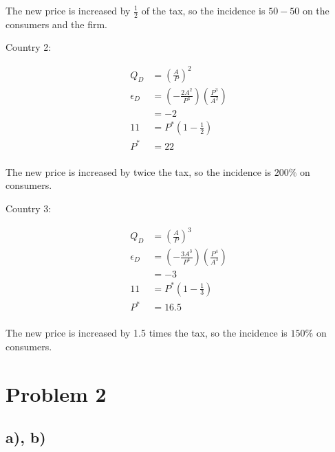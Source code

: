 \documentclass[12pt,letterpaper]{article}
\theoremstyle{definition}
\begin{document}
The new price is increased by $\frac{1}{2}$ of the tax, so the incidence is
$50-50$ on the consumers and the firm.

Country 2:

\begin{align*}
  Q_D &= (\frac{A}{P})^2 \\
  \epsilon_D &= (-\frac{2A^2}{P^3})(\frac{P^3}{A^2}) \\
      &= -2 \\
  11 &= P^*(1 - \frac{1}{2}) \\
  P^* &= 22 \\
\end{align*}

The new price is increased by twice the tax, so the incidence is $200\%$ on
consumers.

Country 3:

\begin{align*}
  Q_D &= (\frac{A}{P})^3 \\
  \epsilon_D &= (-\frac{3A^3}{P^4})(\frac{P^4}{A^3}) \\
      &= -3 \\
  11 &= P^*(1 - \frac{1}{3}) \\
  P^* &= 16.5 \\
\end{align*}

The new price is increased by 1.5 times the tax, so the incidence is $150\%$ on
consumers.

\section*{Problem 2}

\subsection*{a), b)}
\end{document}
